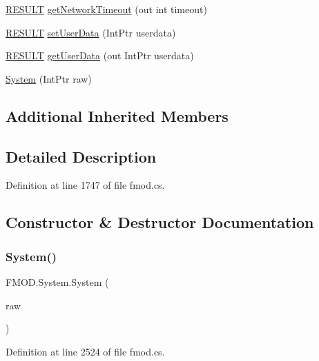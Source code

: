 \begin{DoxyCompactItemize}
\item 
\hyperlink{namespace_f_m_o_d_a305d1176ef3f8c8815861a60407ac33d}{R\+E\+S\+U\+LT} \hyperlink{class_f_m_o_d_1_1_system_ae24ccdfa80732a0d74db768bc3ca8643}{get\+Network\+Timeout} (out int timeout)
\item 
\hyperlink{namespace_f_m_o_d_a305d1176ef3f8c8815861a60407ac33d}{R\+E\+S\+U\+LT} \hyperlink{class_f_m_o_d_1_1_system_a5d9c5a00bef3a9e8326104ef2aceab21}{set\+User\+Data} (Int\+Ptr userdata)
\item 
\hyperlink{namespace_f_m_o_d_a305d1176ef3f8c8815861a60407ac33d}{R\+E\+S\+U\+LT} \hyperlink{class_f_m_o_d_1_1_system_a91ca1f6b683c5c6286e3d2f0e3663fa9}{get\+User\+Data} (out Int\+Ptr userdata)
\item 
\hyperlink{class_f_m_o_d_1_1_system_a3411856f163d69f6ad2e26989a2c7181}{System} (Int\+Ptr raw)
\end{DoxyCompactItemize}
\subsection*{Additional Inherited Members}


\subsection{Detailed Description}


Definition at line 1747 of file fmod.\+cs.



\subsection{Constructor \& Destructor Documentation}
\mbox{\label{class_f_m_o_d_1_1_system_a3411856f163d69f6ad2e26989a2c7181}} 
\subsubsection{\texorpdfstring{System()}{System()}}
{\footnotesize\ttfamily F\+M\+O\+D.\+System.\+System (\begin{DoxyParamCaption}\item[{Int\+Ptr}]{raw }\end{DoxyParamCaption})}



Definition at line 2524 of file fmod.\+cs.



